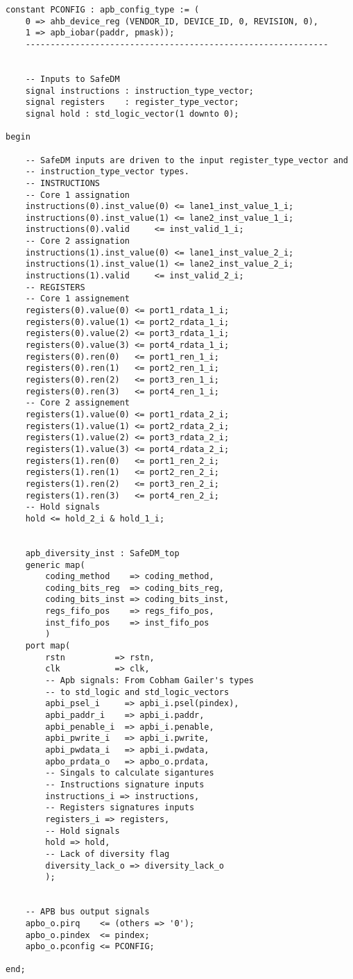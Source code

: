 \begin{lstlisting}[label=ins-prot,caption=SafeDM instance example,style=vhdl,frame=none,tabsize=2]
	constant PCONFIG : apb_config_type := (
	0 => ahb_device_reg (VENDOR_ID, DEVICE_ID, 0, REVISION, 0),
	1 => apb_iobar(paddr, pmask));
	-------------------------------------------------------------

	
	-- Inputs to SafeDM
	signal instructions : instruction_type_vector;
	signal registers    : register_type_vector;
	signal hold : std_logic_vector(1 downto 0);

begin

	-- SafeDM inputs are driven to the input register_type_vector and 
	-- instruction_type_vector types.
	-- INSTRUCTIONS
	-- Core 1 assignation
	instructions(0).inst_value(0) <= lane1_inst_value_1_i;
	instructions(0).inst_value(1) <= lane2_inst_value_1_i;
	instructions(0).valid     <= inst_valid_1_i;  
	-- Core 2 assignation
	instructions(1).inst_value(0) <= lane1_inst_value_2_i;
	instructions(1).inst_value(1) <= lane2_inst_value_2_i;
	instructions(1).valid     <= inst_valid_2_i;  
	-- REGISTERS
	-- Core 1 assignement
	registers(0).value(0) <= port1_rdata_1_i; 
	registers(0).value(1) <= port2_rdata_1_i; 
	registers(0).value(2) <= port3_rdata_1_i; 
	registers(0).value(3) <= port4_rdata_1_i; 
	registers(0).ren(0)   <= port1_ren_1_i; 
	registers(0).ren(1)   <= port2_ren_1_i; 
	registers(0).ren(2)   <= port3_ren_1_i; 
	registers(0).ren(3)   <= port4_ren_1_i; 
	-- Core 2 assignement
	registers(1).value(0) <= port1_rdata_2_i; 
	registers(1).value(1) <= port2_rdata_2_i; 
	registers(1).value(2) <= port3_rdata_2_i; 
	registers(1).value(3) <= port4_rdata_2_i; 
	registers(1).ren(0)   <= port1_ren_2_i; 
	registers(1).ren(1)   <= port2_ren_2_i; 
	registers(1).ren(2)   <= port3_ren_2_i; 
	registers(1).ren(3)   <= port4_ren_2_i; 
	-- Hold signals
	hold <= hold_2_i & hold_1_i;

	
	apb_diversity_inst : SafeDM_top
	generic map(
		coding_method    => coding_method,
		coding_bits_reg  => coding_bits_reg,
		coding_bits_inst => coding_bits_inst,
		regs_fifo_pos    => regs_fifo_pos,
		inst_fifo_pos    => inst_fifo_pos
		)
	port map(
		rstn          => rstn, 
		clk           => clk, 
		-- Apb signals: From Cobham Gailer's types
		-- to std_logic and std_logic_vectors
		apbi_psel_i     => apbi_i.psel(pindex),     
		apbi_paddr_i    => apbi_i.paddr,    
		apbi_penable_i  => apbi_i.penable,  
		apbi_pwrite_i   => apbi_i.pwrite,   
		apbi_pwdata_i   => apbi_i.pwdata,   
		apbo_prdata_o   => apbo_o.prdata,   
		-- Singals to calculate sigantures
		-- Instructions signature inputs
		instructions_i => instructions,
		-- Registers signatures inputs
		registers_i => registers,
		-- Hold signals
		hold => hold,
		-- Lack of diversity flag
		diversity_lack_o => diversity_lack_o
		);


	-- APB bus output signals
	apbo_o.pirq    <= (others => '0');
	apbo_o.pindex  <= pindex;
	apbo_o.pconfig <= PCONFIG;
	
end;  

\end{lstlisting}


\hspace{2cm}
